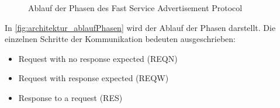 \begin{figure} 
  \centering 
   \qquad 
  \caption{Ablauf der Phasen des Fast Service Advertisement Protocol \cite{iso24102-5}} 
  \label{fig:architektur_ablaufPhasen}
\end{figure}


In \autoref{fig:architektur_ablaufPhasen} wird der Ablauf der Phasen darstellt. Die einzelnen Schritte der Kommunikation bedeuten ausgeschrieben:
\begin{itemize}
	\item Request with no response expected (REQN)
	\item Request with response expected (REQW)
	\item Response to a request (RES)
\end{itemize}

